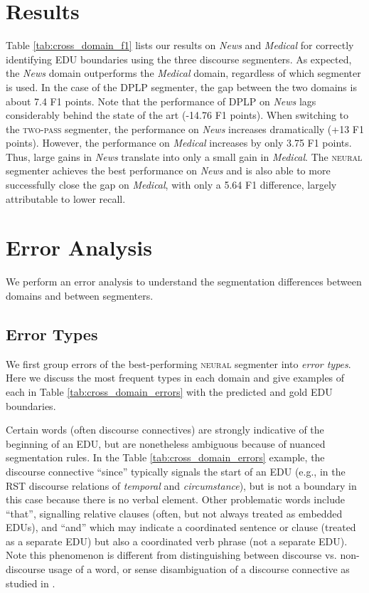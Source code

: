 \section{Results}
Table \ref{tab:cross_domain_f1} lists our results on \textit{News} and \textit{Medical} for correctly identifying EDU boundaries using the three discourse segmenters. As expected, the \textit{News} domain outperforms the \textit{Medical} domain, regardless of which segmenter is used. In the case of the \textsc{DPLP} segmenter, the gap between the two domains is about 7.4 F1 points. Note that the performance of \textsc{DPLP} on \textit{News} lags considerably behind the state of the art (-14.76 F1 points). When switching to the \textsc{two-pass} segmenter, the performance on \textit{News} increases dramatically (+13 F1 points). However, the performance on \textit{Medical} increases by only 3.75 F1 points. Thus, large gains in \textit{News} translate into only a small gain in \textit{Medical}. The \textsc{neural} segmenter achieves the best performance on \textit{News} and is also able to more successfully close the gap on \textit{Medical}, with only a 5.64 F1 difference, largely attributable to lower recall.

\section{Error Analysis}
We perform an error analysis to understand the segmentation differences between domains and between segmenters.

\subsection{Error Types}
\label{sec:error_types}
We first group errors of the best-performing \textsc{neural} segmenter into \emph{error types}. Here we discuss the most frequent types in each domain and give examples of each in Table \ref{tab:cross_domain_errors} with the predicted and gold EDU boundaries.

\medskip
{} Certain words (often discourse connectives) are strongly indicative of the beginning of an EDU, but are nonetheless ambiguous because of nuanced segmentation rules. In the Table \ref{tab:cross_domain_errors} example, the discourse connective ``since'' typically signals the start of an EDU (e.g., in the RST discourse relations of \textit{temporal} and \textit{circumstance}), but is not a boundary in this case because there is no verbal element. Other problematic words include ``that'', signalling relative clauses (often, but not always treated as embedded EDUs), and ``and'' which may indicate a coordinated sentence or clause (treated as a separate EDU) but also a coordinated verb phrase (not a separate EDU). Note this phenomenon is different from distinguishing between discourse vs. non-discourse usage of a word, or sense disambiguation of a discourse connective as studied in \citet{Pitler:2009}.

